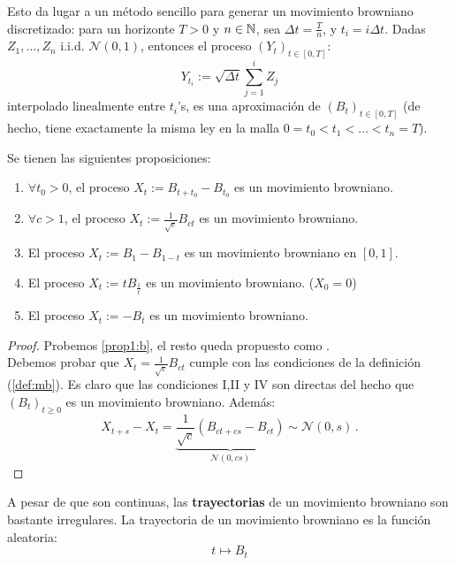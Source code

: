 Esto da lugar a un método sencillo para generar un movimiento browniano discretizado: para un horizonte $T > 0$ y $n \in \mathbb{N}$, sea $\Delta t = \frac{T}{n}$, y $t_i = i \Delta t$.  Dadas $Z_1, \ldots, Z_n$ i.i.d. $\mathcal{N}(0,1)$, entonces el proceso $(Y_{t})_{t \in [0,T]}$: 
\begin{equation*}
    Y_{t_i} := \sqrt{\Delta t} \sum_{j=1}^{i} Z_j
\end{equation*}
interpolado linealmente entre $t_i$'s, es una aproximación de $(B_t)_{t \in [0,T]}$ (de hecho, tiene exactamente la misma ley en la malla $0 = t_0 < t_1 < \ldots < t_n = T$). 

\begin{proposition}
Se tienen las siguientes proposiciones:
\begin{enumerate}
    \item \label{prop1:a} $\forall  t_0 > 0$, el proceso $X_t := B_{t + t_0} - B_{t_0}$ es un movimiento browniano.
    \item \label{prop1:b} $\forall c > 1$, el proceso $X_t := \frac{1}{\sqrt{c}} B_{ct}$ es un movimiento browniano.
    \item \label{prop1:c} El proceso $X_t := B_1 - B_{1-t}$ es un movimiento browniano en $[0,1]$.
    \item \label{prop1:d} El proceso $X_t := t B_{\frac{1}{t}}$ es un movimiento browniano. ($X_0 = 0$)
    \item \label{prop1:e} El proceso $X_t := -B_{t}$ es un movimiento browniano.
\end{enumerate}
\end{proposition}

\begin{proof}
\gris
Probemos \ref{prop1:b}, el resto queda propuesto como \ejercicio.
\\ \gris Debemos probar que $X_t = \frac{1}{\sqrt{c}} B_{ct}$ cumple con las condiciones de la definición (\ref{def:mb}). Es claro  que las condiciones I,II y IV son directas del hecho que $(B_t)_{t \geq 0}$ es un movimiento browniano. Además: 
\begin{equation*}
    X_{t+s} - X_t = \underbrace{\frac{1}{\sqrt{c} } \left( B_{ct + cs} - B_{ct} \right)}_{\mathcal{N}(0,cs)} \sim  \mathcal{N}(0,s)\,.
\end{equation*}
\findem
\negro
\end{proof}

A pesar de que son continuas, las \textbf{trayectorias} de un movimiento browniano son bastante irregulares. La trayectoria de un movimiento browniano es la función aleatoria:
\begin{equation*}
     t \mapsto B_t
\end{equation*}


